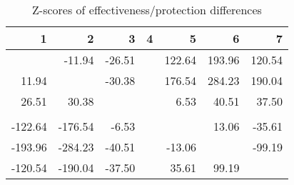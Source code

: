 \begin{table}[ht]
\centering
\begin{tabular}{rrrrrrr}
  \hline
1 & 2 & 3 & 4 & 5 & 6 & 7 \\ 
  \hline
 & -11.94 & -26.51 &  & 122.64 & 193.96 & 120.54 \\ 
  11.94 &  & -30.38 &  & 176.54 & 284.23 & 190.04 \\ 
  26.51 & 30.38 &  &  & 6.53 & 40.51 & 37.50 \\ 
   &  &  &  &  &  &  \\ 
  -122.64 & -176.54 & -6.53 &  &  & 13.06 & -35.61 \\ 
  -193.96 & -284.23 & -40.51 &  & -13.06 &  & -99.19 \\ 
  -120.54 & -190.04 & -37.50 &  & 35.61 & 99.19 &  \\ 
   \hline
\end{tabular}
\caption{Z-scores of effectiveness/protection differences} 
\end{table}
